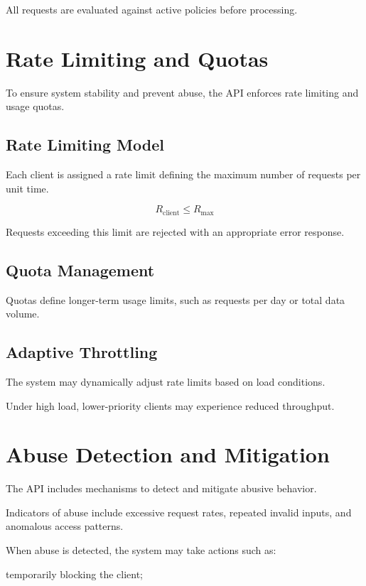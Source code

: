 All requests are evaluated against active policies before processing.

\section{Rate Limiting and Quotas}

To ensure system stability and prevent abuse, the API enforces rate limiting and usage quotas.

\subsection{Rate Limiting Model}

Each client is assigned a rate limit defining the maximum number of requests per unit time.

\begin{equation}
R_{\text{client}} \leq R_{\max}
\end{equation}

Requests exceeding this limit are rejected with an appropriate error response.

\subsection{Quota Management}

Quotas define longer-term usage limits, such as requests per day or total data volume.

\subsection{Adaptive Throttling}

The system may dynamically adjust rate limits based on load conditions.

Under high load, lower-priority clients may experience reduced throughput.

\section{Abuse Detection and Mitigation}

The API includes mechanisms to detect and mitigate abusive behavior.

Indicators of abuse include excessive request rates, repeated invalid inputs, and anomalous access patterns.

When abuse is detected, the system may take actions such as:

temporarily blocking the client;


